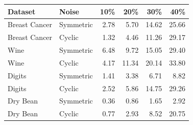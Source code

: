 \begin{tabular}{llrrrr}
\toprule
Dataset & Noise & 10\% & 20\% & 30\% & 40\% \\
\midrule
Breast Cancer & Symmetric & 2.78 & 5.70 & 14.62 & 25.66 \\
Breast Cancer & Cyclic & 1.32 & 4.46 & 11.26 & 29.17 \\
Wine & Symmetric & 6.48 & 9.72 & 15.05 & 29.40 \\
Wine & Cyclic & 4.17 & 11.34 & 20.14 & 33.80 \\
Digits & Symmetric & 1.41 & 3.38 & 6.71 & 8.82 \\
Digits & Cyclic & 2.52 & 5.86 & 14.75 & 29.26 \\
Dry Bean & Symmetric & 0.36 & 0.86 & 1.65 & 2.92 \\
Dry Bean & Cyclic & 0.77 & 2.93 & 8.52 & 20.75 \\
\bottomrule
\end{tabular}

